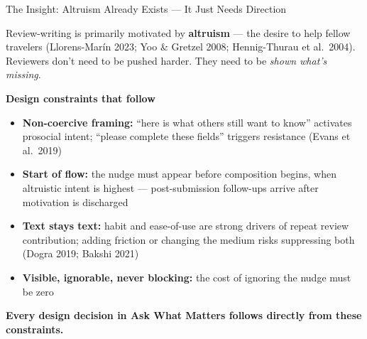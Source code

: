 \documentclass[aspectratio=169,10pt]{beamer}
\newcommand{\shead}[1]{\smallskip\textbf{#1}\par\smallskip}
\begin{document}
\begin{frame}{The Insight: Altruism Already Exists --- It Just Needs Direction}

Review-writing is primarily motivated by \textbf{altruism} --- the desire to help fellow travelers
(Llorens-Mar\'in 2023; Yoo \& Gretzel 2008; Hennig-Thurau et al.\ 2004).
Reviewers don't need to be pushed harder. They need to be \textit{shown what's missing}.

\medskip
\shead{Design constraints that follow}
\begin{itemize}
  \item \textbf{Non-coercive framing:} ``here is what others still want to know'' activates prosocial intent;
        ``please complete these fields'' triggers resistance (Evans et al.\ 2019)
  \item \textbf{Start of flow:} the nudge must appear before composition begins, when altruistic intent
        is highest --- post-submission follow-ups arrive after motivation is discharged
  \item \textbf{Text stays text:} habit and ease-of-use are strong drivers of repeat review contribution;
        adding friction or changing the medium risks suppressing both (Dogra 2019; Bakshi 2021)
  \item \textbf{Visible, ignorable, never blocking:} the cost of ignoring the nudge must be zero
\end{itemize}

\medskip
\textbf{Every design decision in Ask What Matters follows directly from these constraints.}

\end{frame}
\end{document}
